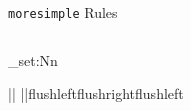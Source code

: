 \documentclass{beamer}
\begin{document}
\begin{frame}[fragile]{\texttt{moresimple} Rules}
  \begin{columns}
    \begin{column}{0.6\textwidth}
      \begin{latexcode}
        \setstocksize{260mm}{190mm}
        \settrimmedsize{\stockheight}{\stockwidth}{*}
        \settrims{0pt}{0pt}
        \checkandfixthelayout


        \ExplSyntaxOn
        \dim_set:Nn \headwidth { \textwidth + \marginparsep + \marginparwidth }
        \ExplSyntaxOff

        |\linebreak|{\color{WildStrawberry}}{}
        |\linebreak|{flushleft}{flushright}{flushleft}
      \end{latexcode}
    \end{column}


\end{columns}
\end{frame}
\end{document}
